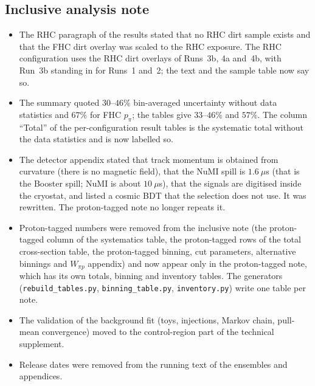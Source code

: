 \subsection{Inclusive analysis note}
\begin{itemize}\itemsep1pt
  \item The RHC paragraph of the results stated that no RHC dirt sample exists and that the FHC dirt
    overlay was scaled to the RHC exposure. The RHC configuration uses the RHC dirt overlays of
    Runs~3b, 4a and~4b, with Run~3b standing in for Runs~1 and~2; the text and the sample table now
    say so.
  \item The summary quoted $30$--$46\%$ bin-averaged uncertainty without data statistics and $67\%$
    for FHC $p_\pi$; the tables give $33$--$46\%$ and $57\%$. The column ``Total'' of the per-configuration
    result tables is the systematic total without the data statistics and is now labelled so.
  \item The detector appendix stated that track momentum is obtained from curvature (there is no
    magnetic field), that the NuMI spill is $1.6~\mu$s (that is the Booster spill; NuMI is about
    $10~\mu$s), that the signals are digitised inside the cryostat, and listed a cosmic BDT that the
    selection does not use. It was rewritten. The proton-tagged note no longer repeats it.
  \item Proton-tagged numbers were removed from the inclusive note (the proton-tagged column of the
    systematics table, the proton-tagged rows of the total cross-section table, the proton-tagged
    binning, cut parameters, alternative binnings and $W_{\pi p}$ appendix) and now appear only in the
    proton-tagged note, which has its own totals, binning and inventory tables. The generators
    (\texttt{rebuild\_tables.py}, \texttt{binning\_table.py}, \texttt{inventory.py}) write one table per
    note.
  \item The validation of the background fit (toys, injections, Markov chain, pull-mean convergence)
    moved to the control-region part of the technical supplement.
  \item Release dates were removed from the running text of the ensembles and appendices.
\end{itemize}

